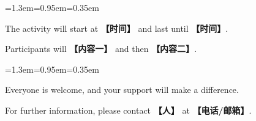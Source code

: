 \documentclass[10pt,a4paper]{ctexart}
\begin{document}
\par\vspace{1pt}
\begin{list}{}{\leftmargin=1.3em=0.95em=0.35em\itemindent=0pt\topsep=0pt\partopsep=0pt\parsep=1.5pt\itemsep=0pt}
\item[{\color{accent}\scriptsize$\blacktriangleright$}]{\footnotesize The activity will start at {\color{accent}\bfseries 【时间】} and last until {\color{accent}\bfseries 【时间】}.}\par{}
\item[{\color{accent}\scriptsize$\blacktriangleright$}]{\footnotesize Participants will {\color{accent}\bfseries 【内容一】} and then {\color{accent}\bfseries 【内容二】}.}\par{}
\end{list}
\par\vspace{1pt}
\begin{list}{}{\leftmargin=1.3em=0.95em=0.35em\itemindent=0pt\topsep=0pt\partopsep=0pt\parsep=1.5pt\itemsep=0pt}
\item[{\color{accent}\scriptsize$\blacktriangleright$}]{\footnotesize Everyone is welcome, and your support will make a difference.}\par{}
\item[{\color{accent}\scriptsize$\blacktriangleright$}]{\footnotesize For further information, please contact {\color{accent}\bfseries 【人】} at {\color{accent}\bfseries 【电话/邮箱】}.}\par{}
\end{list}
\par
\endgroup
\vspace{4pt}\par\nopagebreak
\end{document}
